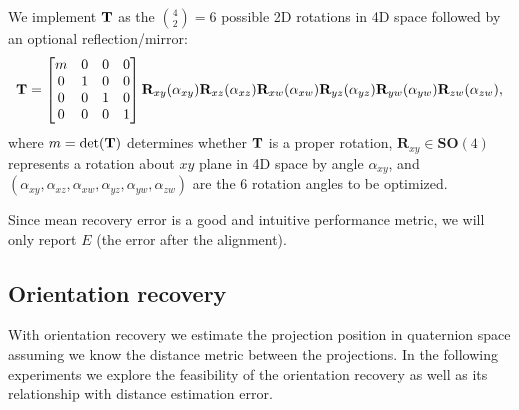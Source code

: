 We implement $\mathbf{T}$ as the $\binom{4}{2}=6$ possible 2D rotations in 4D space followed by an optional reflection/mirror:
\begin{equation*}
    \mathbf{T} =
    \begin{bmatrix}
        m & 0 & 0 & 0 \\
        0 & 1 & 0 & 0 \\
        0 & 0 & 1 & 0 \\
        0 & 0 & 0 & 1 \\
    \end{bmatrix}
    \mathbf{R}_{xy}(\alpha_{xy}) \mathbf{R}_{xz}(\alpha_{xz}) \mathbf{R}_{xw}(\alpha_{xw}) \mathbf{R}_{yz}(\alpha_{yz}) \mathbf{R}_{yw}(\alpha_{yw}) \mathbf{R}_{zw}(\alpha_{zw}),
\end{equation*}
where $m = \det(\mathbf{T})$ determines whether $\mathbf{T}$ is a proper rotation, $\mathbf{R}_{xy} \in \mathbf{SO}(4)$ represents a rotation about $xy$ plane in 4D space by angle $\alpha_{xy}$, and $(\alpha_{xy},\alpha_{xz},\alpha_{xw},\alpha_{yz},\alpha_{yw},\alpha_{zw})$ are the 6 rotation angles to be optimized.

Since mean recovery error is a good and intuitive performance metric, we will only report $E$ (the error after the alignment). 


\subsection{Orientation recovery}\label{sec:results:orientation-recovery}

With orientation recovery we estimate the projection position in quaternion space assuming we know the distance metric between the projections. In the following experiments we explore the feasibility of the orientation recovery as well as its relationship with distance estimation error.

